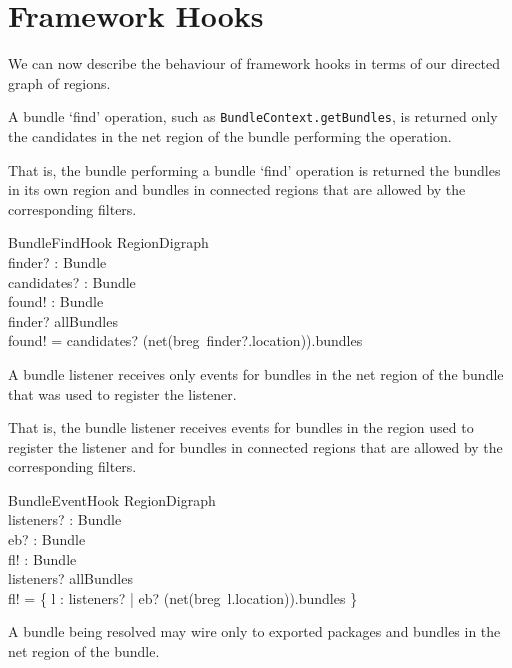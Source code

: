 \documentclass[a4paper,9pt]{article}
\begin{document}
\clearpage
\section{Framework Hooks}
\label{cha:fhooks}

We can now describe the behaviour of framework hooks in terms of our directed graph of regions.

A bundle `find' operation, such as \texttt{BundleContext.getBundles}, is returned only the
candidates in the net region of the bundle performing the operation.

That is, the bundle performing a bundle `find' operation is returned the bundles in its own region
and bundles in connected regions that are allowed by the corresponding filters.
\begin{schema}{BundleFindHook}
  \Xi RegionDigraph \\
  finder? : Bundle \\
  candidates? : \power Bundle \\
  found! : \power Bundle \\
\where
  finder? \in allBundles \\
  found! = candidates? \cap (net(breg~finder?.location)).bundles \\
\end{schema}

A bundle listener receives only events for bundles in the net region of the bundle that was used
to register the listener.

That is, the bundle listener receives events for bundles in the region used to register the listener
and for bundles in connected regions that are allowed by the corresponding filters.
\begin{schema}{BundleEventHook}
  \Xi RegionDigraph \\
  listeners? : \power Bundle \\
  eb? : Bundle \\
  fl! : \power Bundle \\
\where
  listeners? \subseteq allBundles \\
  fl! = \{ l : listeners? | eb? \in (net(breg~l.location)).bundles \} \\
\end{schema}

A bundle being resolved may wire only to exported packages and bundles in the net region of the
bundle.
\end{document}
